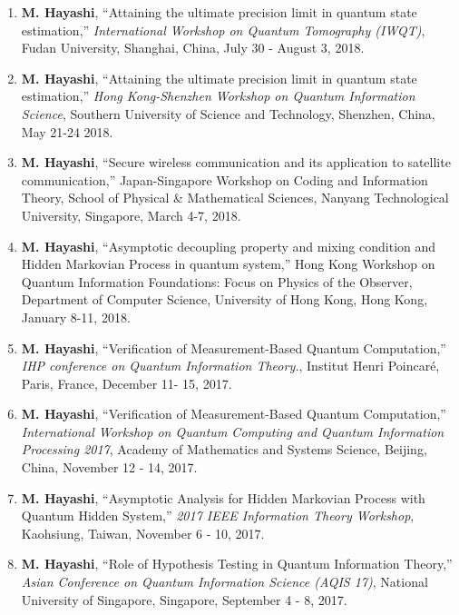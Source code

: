 \documentclass[a4paper,12pt,oneside]{article}
\begin{document}
\begin{enumerate}
\item 
\textbf{M. Hayashi}, 
``Attaining the ultimate precision limit in quantum state estimation,''
{\em International Workshop on Quantum Tomography (IWQT)}, 
Fudan University, Shanghai, China,
July 30 - August 3, 2018.


\item 
\textbf{M. Hayashi}, 
``Attaining the ultimate precision limit in quantum state estimation,''
{\em Hong Kong-Shenzhen Workshop on Quantum Information Science}, 
Southern University of Science and Technology, Shenzhen, China,
May 21-24 2018.

\item 
\textbf{M. Hayashi}, ``Secure wireless communication and its application to 
satellite communication,'' 
Japan-Singapore Workshop on Coding and Information Theory, 
School of Physical \& Mathematical Sciences,
Nanyang Technological University,
Singapore, March 4-7, 2018.


\item 
\textbf{M. Hayashi}, ``Asymptotic decoupling property and mixing condition 
and Hidden Markovian Process in quantum system,'' 
Hong Kong Workshop on Quantum Information Foundations:
Focus on Physics of the Observer, 
Department of Computer Science, University of Hong Kong, 
Hong Kong, January 8-11, 2018.

\item 
\textbf{M. Hayashi}, ``Verification of Measurement-Based Quantum Computation,'' 
{\em IHP conference on Quantum Information Theory.}, 
Institut Henri Poincar\'{e},
Paris, France, December 11- 15, 2017.

\item 
\textbf{M. Hayashi}, ``Verification of Measurement-Based Quantum Computation,'' 
{\em International Workshop on Quantum Computing and Quantum Information Processing 2017}, 
Academy of Mathematics and Systems Science, Beijing, China, November 12 - 14, 2017.

\item 
\textbf{M. Hayashi}, ``Asymptotic Analysis for Hidden Markovian Process with Quantum Hidden System,'' 
{\em 2017 IEEE Information Theory Workshop}, 
Kaohsiung, Taiwan, November 6 - 10, 2017.

\item 
\textbf{M. Hayashi}, ``Role of Hypothesis Testing in Quantum Information Theory,'' 
{\em Asian Conference on Quantum Information Science (AQIS 17)}, 
National University of Singapore, Singapore, September 4 - 8, 2017.



\end{enumerate}
\end{document}
